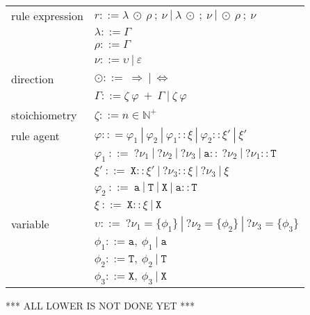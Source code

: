 \documentclass{entcs}
\renewcommand{\~}[0]{\texttildelow}
\begin{document}
\begin{center}
{\small
\hspace*{-1cm}\begin{tabular}{ l l }
 rule expression & $r ::= \lambda ~\odot~ \rho~;~\nu ~|~ \lambda ~\odot~ ;~\nu ~|~ \odot~ \rho~;~\nu $\\
  & $\lambda ::= \Gamma$\\
  & $\rho ::= \Gamma$\\
  & $\nu ::= \upsilon ~|~ \varepsilon$\\
 direction & $\odot ::=~ \Rightarrow~|~\Leftrightarrow $\\
  & $\Gamma ::= \zeta~\varphi~ +~\Gamma ~|~ \zeta~\varphi$\\
 stoichiometry & $\zeta ::= n \in \mathbb{N}^+$\\
 rule agent & $\varphi :: = \varphi_1~|~\varphi_2~|~\varphi_1::\xi~|~\varphi_2::\xi'~|~\xi'$\\
  & $\varphi_1  ~::=~  ?\nu_1~|~?\nu_2~|~?\nu_3~|~\mathtt{a}::~?\nu_2~|~?\nu_1::\mathtt{T}$\\
  & $\xi' ~::=~ \mathtt{X}::\xi'~|~?\nu_3::\xi~|~?\nu_3~|~\xi$\\
  & $\varphi_2  ~::=~  \mathtt{a}~|~\mathtt{T}~|~\mathtt{X}~|~\mathtt{a}::\mathtt{T}$\\
  & $\xi  ~::=~  \mathtt{X}::\xi~|~\mathtt{X}$\\
 variable & $\upsilon ::=~?\nu_1=\{\phi_1\}~|~?\nu_2=\{\phi_2\}~|~?\nu_3=\{\phi_3\}$\\
  & $\phi_1 ::= \mathtt{a},~\phi_1~|~\mathtt{a}$\\
  & $\phi_2 ::= \mathtt{T},~\phi_2~|~\mathtt{T}$\\
  & $\phi_3 ::= \mathtt{X},~\phi_3~|~\mathtt{X}$\\
\end{tabular}
}
\end{center}

*** ALL LOWER IS NOT DONE YET  ***
\end{document}
